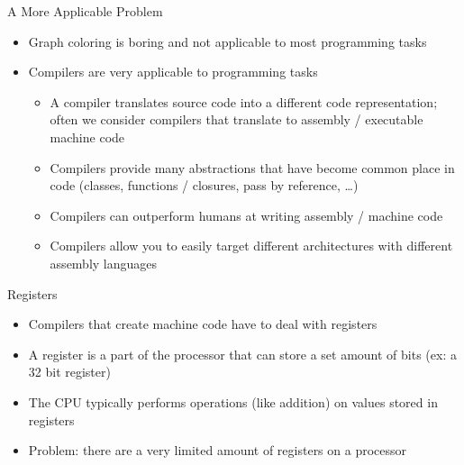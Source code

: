 \documentclass[aspectratio=169]{beamer}
\begin{document}
\begin{frame}{A More Applicable Problem}
    \begin{itemize}
        \item Graph coloring is boring and not applicable to most programming tasks
        \item Compilers are very applicable to programming tasks
        \pause
        \begin{itemize}
            \item A compiler translates source code into a different code representation; often we consider compilers that translate to assembly / executable machine code
            \pause
            \item Compilers provide many abstractions that have become common place in code (classes, functions / closures, pass by reference, \ldots)
            \pause
            \item Compilers can outperform humans at writing assembly / machine code
            \pause
            \item Compilers allow you to easily target different architectures with different assembly languages
        \end{itemize}
    \end{itemize}
\end{frame}

\begin{frame}{Registers}
    \begin{itemize}
        \item Compilers that create machine code have to deal with registers
        \item A register is a part of the processor that can store a set amount of bits (ex: a 32 bit register)
        \item The CPU typically performs operations (like addition) on values stored in registers
        \pause
        \item Problem: there are a very limited amount of registers on a processor
    \end{itemize}
\end{frame}
\end{document}
